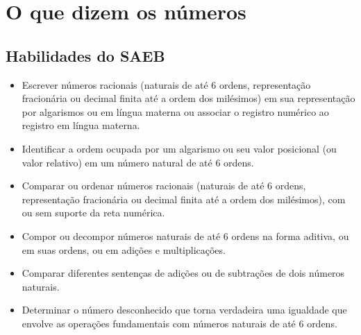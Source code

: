 






\chapter{O que dizem os números}

\vspace*{-1cm}

\section*{Habilidades do SAEB}


\begin{itemize}
  \item Escrever números racionais (naturais de até 6 ordens, representação
fracionária ou decimal finita até a ordem dos milésimos) em sua
representação por algarismos ou em língua materna ou associar o registro
numérico ao registro em língua materna.

  \item Identificar a ordem ocupada por um algarismo ou seu valor posicional
(ou valor relativo) em um número natural de até 6 ordens.

  \item Comparar ou ordenar números racionais (naturais de até 6 ordens,
representação fracionária ou decimal finita até a ordem dos milésimos),
com ou sem suporte da reta numérica.

  \item Compor ou decompor números naturais de até 6 ordens na forma aditiva,
ou em suas ordens, ou em adições e multiplicações.

  \item Comparar diferentes sentenças de adições ou de subtrações de dois
números naturais.

  \item Determinar o número desconhecido que torna verdadeira uma igualdade
que envolve as operações fundamentais com números naturais de até 6
ordens.
\end{itemize}


